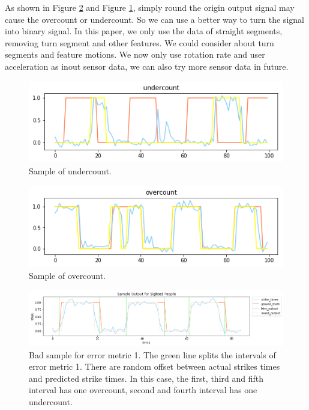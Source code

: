 \documentclass[11pt]{article}
\begin{document}
{As shown in Figure \ref{fig:overcount} and Figure \ref{fig:undercount}, simply round the origin output signal may cause the overcount or undercount. So we can use a better way to turn the signal into binary signal. In this paper, we only use the data of straight segments, removing turn segment and other features. We could consider about turn segments and feature motions. We now only use rotation rate and user acceleration as inout sensor data, we can also try more sensor data in future.

\begin{figure}[ht]
\centering
\includegraphics[scale=0.4]{undercount}
\caption{Sample of undercount.}
\label{fig:undercount}
\end{figure}

\begin{figure}[ht]
\centering
\includegraphics[scale=0.4]{overcount}
\caption{Sample of overcount.}
\label{fig:overcount}
\end{figure}


\begin{figure}[ht]
\centering
\includegraphics[scale=0.5]{output_small_metric2}
\caption{Bad sample for error metric 1. The green line splits the intervals of error metric 1. There are random offset between actual strikes times and predicted strike times. In this case, the first, third and fifth interval has one overcount, second and fourth interval has one undercount.}
\label{fig:output_small_metric2}
\end{figure}




}
\end{document}
